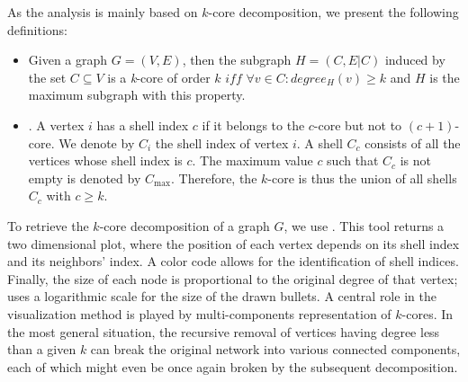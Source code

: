 

As the analysis is mainly based on $k$-core decomposition, we present the
following definitions:
\begin{itemize}
  \item{} Given a graph $G=(V,E)$, then the
  subgraph $H=(C,E|C)$ induced by the set $ C\subseteq V$ is a \textit{k}-core
  of order $k$ $iff$ $\forall v \in C: degree_{H}(v)\geq k$ and $H$ is the
  maximum subgraph with this property.
  \item{}. A vertex $i$ has a shell index $c$ if it
  belongs to the $c$-core but not to $(c+1)$-core. We denote by $C_i$ the shell
  index of vertex $i$. A shell $C_c$ consists of all the vertices whose shell
  index is $c$. The maximum value $c$ such that $C_c$ is not empty is denoted by
  $C_{\max}$.  Therefore, the $k$-core is thus the union of all shells $C_c$ with
  $c \geq k$.
\end{itemize}

To retrieve the $k$-core decomposition of a graph $G$, we use
\lanet\cite{Alvarez06k}.  This tool returns a two dimensional plot,
where the position of each vertex depends on its shell index and its neighbors'
index. A color code allows for the identification of shell indices. 
Finally, the size of each node is proportional to the original degree of that vertex; 
\lanet uses a logarithmic scale for the size of the drawn bullets. A central 
role in the visualization method is played by multi-components
representation of $k$-cores.   In the
most general situation, the recursive removal of vertices having degree less	
than a given $k$ can break the original network into various connected
components, each of which might even be once again broken by the subsequent
decomposition.

